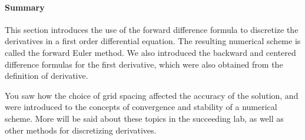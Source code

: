 \paragraph{Summary}

This section introduces the use of the forward difference formula to
discretize the derivatives in a first order differential equation.
The resulting numerical scheme is called the forward Euler method.  
We also introduced the backward and centered difference formulas for
the first derivative, which were also obtained from the definition of 
derivative.  

You saw how the choice of grid spacing affected the accuracy of the
solution, and were introduced to the concepts of convergence and
stability of a numerical scheme.
More will be said about these topics in the succeeding lab,
as well as other methods for discretizing derivatives.

